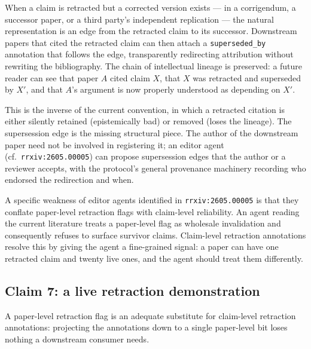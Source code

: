 \documentclass{rrxiv}
\begin{document}
When a claim is retracted but a corrected version exists --- in a corrigendum, a successor paper, or a third party's independent replication --- the natural representation is an edge from the retracted claim to its successor. Downstream papers that cited the retracted claim can then attach a \texttt{superseded\_by} annotation that follows the edge, transparently redirecting attribution without rewriting the bibliography. The chain of intellectual lineage is preserved: a future reader can see that paper $A$ cited claim $X$, that $X$ was retracted and superseded by $X'$, and that $A$'s argument is now properly understood as depending on $X'$.

This is the inverse of the current convention, in which a retracted citation is either silently retained (epistemically bad) or removed (loses the lineage). The supersession edge is the missing structural piece. The author of the downstream paper need not be involved in registering it; an editor agent (cf.\ \texttt{rrxiv:2605.00005}) can propose supersession edges that the author or a reviewer accepts, with the protocol's general provenance machinery recording who endorsed the redirection and when.

\begin{rrxivremark}
A specific weakness of editor agents identified in \texttt{rrxiv:2605.00005} is that they conflate paper-level retraction flags with claim-level reliability. An agent reading the current literature treats a paper-level flag as wholesale invalidation and consequently refuses to surface survivor claims. Claim-level retraction annotations resolve this by giving the agent a fine-grained signal: a paper can have one retracted claim and twenty live ones, and the agent should treat them differently.
\end{rrxivremark}

\subsection*{Claim 7: a live retraction demonstration}
\label{sec:demo}

\begin{claim}[type=theoretical, evidence=argument, confidence=0.05, rationale={Included as a live retraction demonstration; withdrawn by the prepared claim-retraction annotation record in the paper repository}, labels={retraction, metascience, demo-retraction}, title=Claim 7 (retracted by design)]
\label{claim:c7}
A paper-level retraction flag is an adequate substitute for claim-level retraction annotations: projecting the annotations down to a single paper-level bit loses nothing a downstream consumer needs.
\end{claim}
\end{document}
